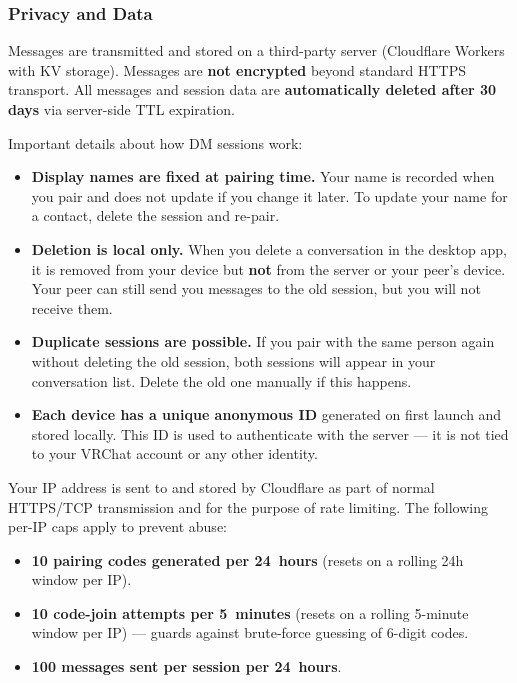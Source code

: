 \documentclass[10pt]{article}
\begin{document}
\subsubsection{Privacy and Data}

\begin{warnbox}
  Messages are transmitted and stored on a third-party server (Cloudflare Workers with KV storage). Messages are \textbf{not encrypted} beyond standard HTTPS transport. All messages and session data are \textbf{automatically deleted after 30 days} via server-side TTL expiration.
\end{warnbox}

\noindent Important details about how DM sessions work:

\begin{itemize}[leftmargin=2em, nosep]
  \item \textbf{Display names are fixed at pairing time.} Your name is recorded when you pair and does not update if you change it later. To update your name for a contact, delete the session and re-pair.
  \item \textbf{Deletion is local only.} When you delete a conversation in the desktop app, it is removed from your device but \textbf{not} from the server or your peer's device. Your peer can still send you messages to the old session, but you will not receive them.
  \item \textbf{Duplicate sessions are possible.} If you pair with the same person again without deleting the old session, both sessions will appear in your conversation list. Delete the old one manually if this happens.
  \item \textbf{Each device has a unique anonymous ID} generated on first launch and stored locally. This ID is used to authenticate with the server --- it is not tied to your VRChat account or any other identity.
\end{itemize}

\noindent Your IP address is sent to and stored by Cloudflare as part of normal HTTPS/TCP transmission and for the purpose of rate limiting. The following per-IP caps apply to prevent abuse:

\begin{itemize}[leftmargin=2em, nosep]
  \item \textbf{10 pairing codes generated per 24~hours} (resets on a rolling 24h window per IP).
  \item \textbf{10 code-join attempts per 5~minutes} (resets on a rolling 5-minute window per IP) --- guards against brute-force guessing of 6-digit codes.
  \item \textbf{100 messages sent per session per 24~hours}.
\end{itemize}
\end{document}
